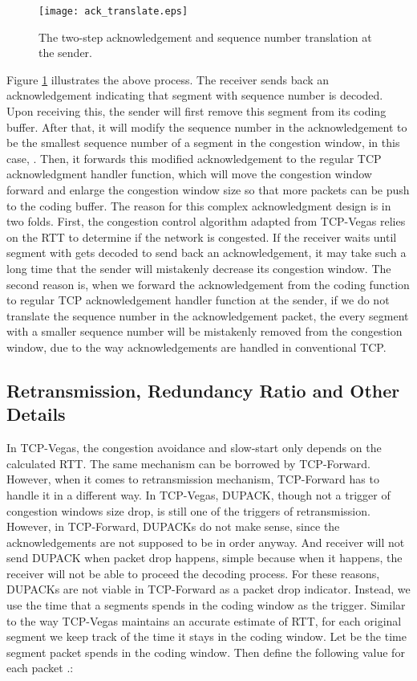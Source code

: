 \documentclass[10pt, conference, final, letterpaper]{IEEEtran}
\theoremstyle{definition}
\begin{document}
\begin{figure}[htb]
	\begin{center}
		\texttt{[image: ack\_translate.eps]}
	\end{center}
	\caption{The two-step acknowledgement and sequence number translation at the sender.}
	\label{fig:acks}
\end{figure}

Figure \ref{fig:acks} illustrates the above process. The receiver sends back an acknowledgement indicating that segment with sequence number  is decoded. Upon receiving this, the sender will first remove this segment from its coding buffer. After that, it will modify the sequence number in the acknowledgement to be the smallest sequence number of a segment in the congestion window, in this case, . Then, it forwards this modified acknowledgement to the regular TCP acknowledgment handler function, which will move the congestion window forward and enlarge the congestion window size so that more packets can be push to the coding buffer. The reason for this complex acknowledgment design is in two folds. First, the congestion control algorithm adapted from TCP-Vegas relies on the RTT to determine if the network is congested. If the receiver waits until segment with  gets decoded to send back an acknowledgement, it may take such a long time that the sender will mistakenly decrease its congestion window. The second reason is, when we forward the acknowledgement from the coding function to regular TCP acknowledgement handler function at the sender, if we do not translate the sequence number in the acknowledgement packet, the every segment with a smaller sequence number will be mistakenly removed from the congestion window, due to the way acknowledgements are handled in conventional TCP.

\subsection{Retransmission, Redundancy Ratio and Other Details}

In TCP-Vegas, the congestion avoidance and slow-start only depends on the calculated RTT. The same mechanism can be borrowed by TCP-Forward. However, when it comes to retransmission mechanism, TCP-Forward has to handle it in a different way. In TCP-Vegas, DUPACK, though not a trigger of congestion windows size drop, is still one of the triggers of retransmission. However, in TCP-Forward, DUPACKs do not make sense, since the acknowledgements are not supposed to be in order anyway. And receiver will not send DUPACK when packet drop happens, simple because when it happens, the receiver will not be able to proceed the decoding process. For these reasons, DUPACKs are not viable in TCP-Forward as a packet drop indicator. Instead, we use the time that a segments spends in the coding window as the trigger. Similar to the way TCP-Vegas maintains an accurate estimate of RTT, for each original segment we keep track of the time it stays in the coding window. Let  be the time segment packet  spends in the coding window. Then define the following value  for each packet .:
\end{document}
